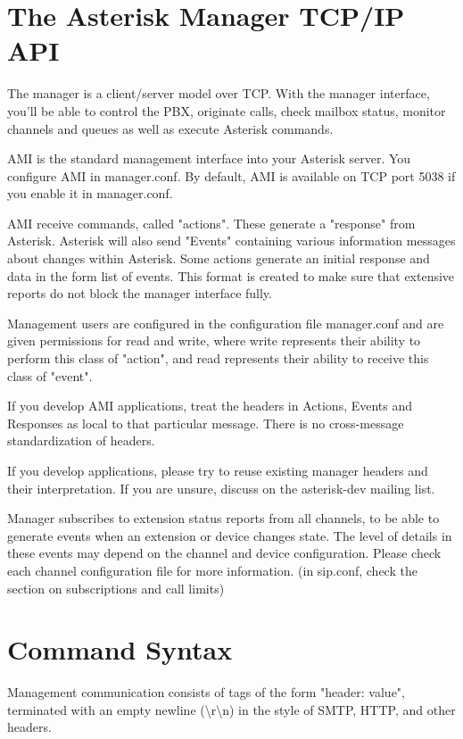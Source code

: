 \section{The Asterisk Manager TCP/IP API}

The manager is a client/server model over TCP. With the manager interface,
you'll be able to control the PBX, originate calls, check mailbox status,
monitor channels and queues as well as execute Asterisk commands.

AMI is the standard management interface into your Asterisk server.
You configure AMI in manager.conf. By default, AMI is available on
TCP port 5038 if you enable it in manager.conf.

AMI receive commands, called "actions". These generate a "response"
from Asterisk. Asterisk will also send "Events" containing various
information messages about changes within Asterisk. Some actions
generate an initial response and data in the form list of events.
This format is created to make sure that extensive reports do not
block the manager interface fully.

Management users are configured in the configuration file manager.conf and are
given permissions for read and write, where write represents their ability
to perform this class of "action", and read represents their ability to
receive this class of "event".

If you develop AMI applications, treat the headers
in Actions, Events and Responses as local to that particular
message. There is no cross-message standardization of headers.

If you develop applications, please try to reuse existing manager
headers and their interpretation. If you are unsure, discuss on
the asterisk-dev mailing list.

Manager subscribes to extension status reports from all channels,
to be able to generate events when an extension or device changes
state. The level of details in these events may depend on the channel
and device configuration. Please check each channel configuration
file for more information. (in sip.conf, check the section on
subscriptions and call limits)


\section{Command Syntax}

Management communication consists of tags of the form "header: value",
terminated with an empty newline (\textbackslash r\textbackslash n) in 
the style of SMTP, HTTP, and other headers.

